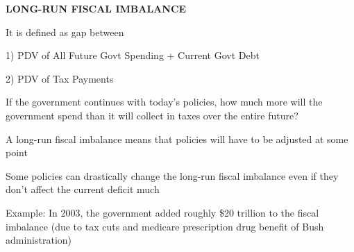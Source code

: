 \documentclass[landscape]{slides}
\begin{document}
\begin{slide}
\begin{center}
{\bf LONG-RUN FISCAL IMBALANCE}
\end{center}
It is defined as gap between

1) PDV of All Future Govt Spending + Current Govt Debt 

2) PDV of Tax Payments   

If the  government continues with today's policies, how much more will the government spend than it will collect in taxes over the entire future? 

A long-run fiscal imbalance means that policies will have to be adjusted at some point

Some policies can drastically change the long-run fiscal imbalance even if they don't affect the current deficit much

\small Example: In 2003, the government added roughly \$20 trillion to the fiscal imbalance (due to tax cuts and medicare prescription drug benefit of Bush administration)

\end{slide}
\end{document}
